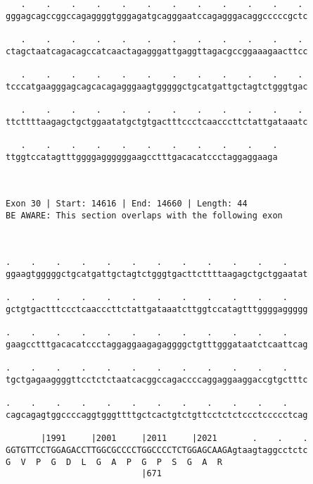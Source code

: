 \documentclass{article}
\begin{document}
\begin{Verbatim}
   .    .    .    .    .    .    .    .    .    .    .    . 
gggagcagccggccagaggggtgggagatgcagggaatccagagggacaggcccccgctc
                                                            
   .    .    .    .    .    .    .    .    .    .    .    . 
ctagctaatcagacagccatcaactagagggattgaggttagacgccggaaagaacttcc
                                                            
   .    .    .    .    .    .    .    .    .    .    .    . 
tcccatgaagggagcagcacagagggaagtgggggctgcatgattgctagtctgggtgac
                                                            
   .    .    .    .    .    .    .    .    .    .    .    . 
ttcttttaagagctgctggaatatgctgtgactttccctcaacccttctattgataaatc
                                                            
   .    .    .    .    .    .    .    .    .    .    .
ttggtccatagtttggggaggggggaagcctttgacacatccctaggaggaaga
                                                      
                                                      
 
Exon 30 | Start: 14616 | End: 14660 | Length: 44
BE AWARE: This section overlaps with the following exon



.    .    .    .    .    .    .    .    .    .    .    .    
ggaagtgggggctgcatgattgctagtctgggtgacttcttttaagagctgctggaatat
                                                            
.    .    .    .    .    .    .    .    .    .    .    .    
gctgtgactttccctcaacccttctattgataaatcttggtccatagtttggggaggggg
                                                            
.    .    .    .    .    .    .    .    .    .    .    .    
gaagcctttgacacatccctaggaggaagagaggggctgtttgggataatctcaattcag
                                                            
.    .    .    .    .    .    .    .    .    .    .    .    
tgctgagaaggggttcctctctaatcacggccagaccccaggaggaaggaccgtgctttc
                                                            
.    .    .    .    .    .    .    .    .    .    .    .    
cagcagagtggccccaggtgggttttgctcactgtctgttcctctctccctccccctcag
                                                            
       |1991     |2001     |2011     |2021       .    .    .
GGTGTTCCTGGAGACCTTGGCGCCCCTGGCCCCTCTGGAGCAAGAgtaagtaggcctctc
G  V  P  G  D  L  G  A  P  G  P  S  G  A  R                 
                           |671                             
  

\end{Verbatim}
\end{document}
